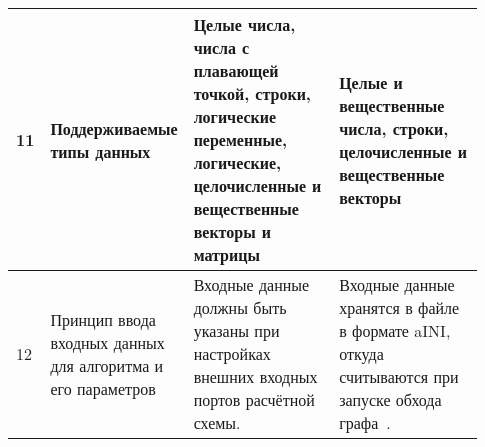 \begin{landscape}
\begin{longtable}{|p{0.03\linewidth}|p{0.2\linewidth}|p{0.35\linewidth}|p{0.35\linewidth}|}
        11         & Поддерживаемые типы данных                                                                 & Целые числа, числа с плавающей точкой, строки, логические переменные, логические, целочисленные и вещественные векторы и матрицы                                                                                                                                                                                                                                                                                                                                                                                                                                                                                                                                   & Целые и вещественные числа, строки, целочисленные и вещественные векторы                                                                                                                                                                                                                         \\
        \hline
        12         & Принцип ввода входных данных для алгоритма и его параметров                                & Входные данные должны быть указаны при настройках внешних входных портов расчётной схемы.                                                                                                                                                                                                                                                                                                                                                                                                                                                                                                                                                                          & Входные данные хранятся в файле в формате \gls{aINI}\cite{SokAINI}, откуда считываются при запуске обхода графа~\cite{SokolovPershin2017}.                                                                                                                                                       \\
        \hline

\end{longtable}
\end{landscape}
